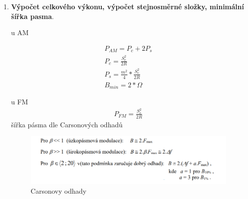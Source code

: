 \begin{enumerate}
\item \textbf{Výpočet celkového výkonu, výpočet stejnosměrné složky, minimální šířka pasma}.

 u AM

\begin{align*}
    P_{AM} = P_c + 2P_s \\
    P_c = \frac{S_c^2}{2R}\\
    P_s = \frac{m^2}{4}*\frac{S_c^2}{2R} \\
    B_{min}=2*\Omega
\end{align*}

u FM 
\begin{align*}
    P_{FM}= \frac{S_c^2}{2R}
\end{align*}
šířka pásma dle Carsonových odhadů
\begin{figure}[h!]
    \centering
    \includegraphics[scale=0.76]{images/Carson.png}
    \caption{Carsonovy odhady}
    \label{fig:enter-label}
\end{figure}
\end{enumerate}
\clearpage
